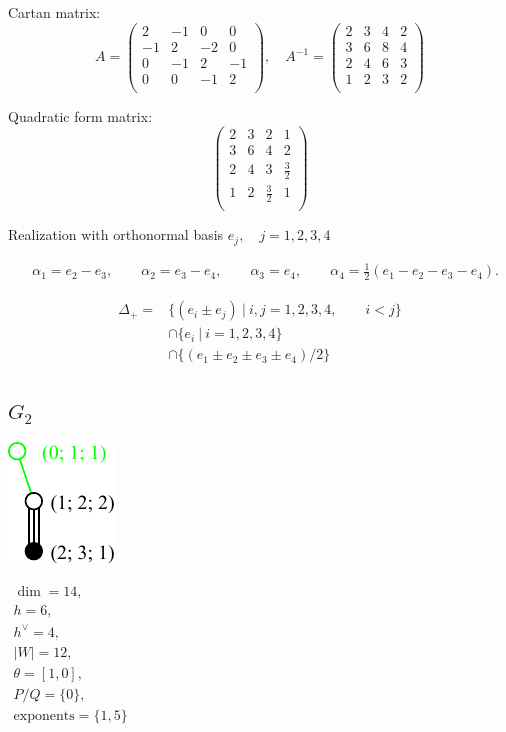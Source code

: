 \documentclass[12pt]{article}
\newcommand{\hc}{h^{\vee}}
\begin{document}
Cartan matrix:
\[
A=\left(
\begin{array}{cccc}
 2& -1& 0& 0\\
 -1& 2& -2&0 \\
 0 &-1 &2 &-1 \\
 0 &0  &-1 &2 \\
\end{array}
\right),\quad
A^{-1}=\left(
\begin{array}{cccc}
 2& 3 & 4& 2\\
 3 & 6&  8&4 \\
 2 & 4 &6 & 3 \\
 1 &2  & 3 &2 \\
\end{array}
\right)
\]

Quadratic form matrix:
\[
\left(
\begin{array}{cccc}
 2& 3 & 2& 1\\
 3 & 6& 4&2 \\
 2 & 4 & 3 & \frac32 \\
 1 &2  & \frac32 &1 \\
\end{array}
\right)
\]

Realization with orthonormal basis $e_j,\quad j=1,2,3,4$

\begin{align*}
  &\alpha_1=e_2-e_3,\qquad
  \alpha_2=e_3-e_4,\qquad
  \alpha_3=e_4,\qquad
  \alpha_4=\frac12(e_1-e_2-e_3-e_4).
\end{align*}

\begin{align*}
 \Delta_{+}=&\{(e_i \pm e_j)\ |\ i,j=1,2,3,4,\qquad i<j\} \\
      &\cap
       \{ e_{i}\ |\ i=1,2,3,4\}\\
      &\cap
       \{ (e_{1}\pm e_2 \pm e_3 \pm e_4)/2\}
\end{align*}
\newpage

%
\subsection*{$G_2$}
\parbox{8cm}{\includegraphics{lie_G2.pdf}}
$
\begin{array}{l}
 \dim = 14, \\
  h= 6,\\
 \hc= 4,\\
 |W|=12,\\
 \theta=[1,0],\\
 P/Q=\{0\},\\
 \text{exponents}={\{1,5\}}
\end{array}
$
\end{document}
